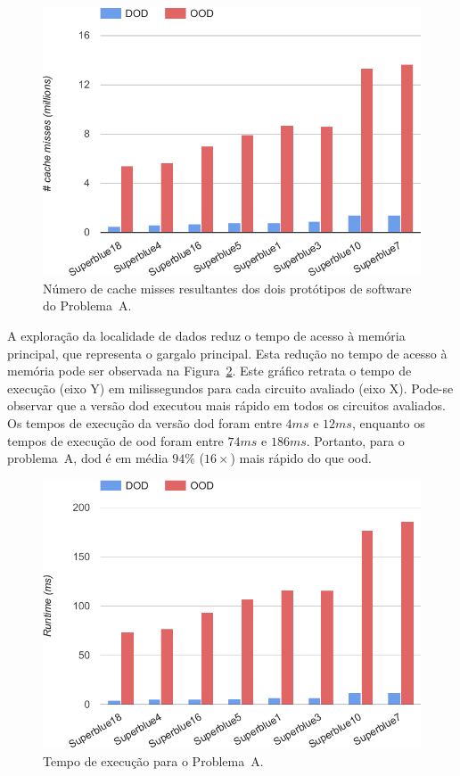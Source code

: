 \begin{figure}[ht]
    \centering
    \includegraphics[width=0.65\linewidth]{img/results/missProblemA}
    \caption[Cache misses do Problema~A.]{Número de cache misses resultantes dos dois protótipos de software do Problema~A.}
    \label{fig:missProblemA}
\end{figure}

A exploração da localidade de dados reduz o tempo de acesso à memória principal, que representa o gargalo principal. Esta redução no tempo de acesso à memória pode ser observada na Figura~\ref{fig:runtimeProblemA}. Este gráfico retrata o tempo de execução (eixo Y) em milissegundos para cada circuito avaliado (eixo X). Pode-se observar que a versão \ac{dod} executou mais rápido em todos os circuitos avaliados. Os tempos de execução da versão \ac{dod} foram entre $4ms$ e $12ms$, enquanto os tempos de execução de \ac{ood} foram entre $74ms$ e $186ms$. Portanto, para o problema~A, \ac{dod} é em média $94\%$ ($16\times$) mais rápido do que \ac{ood}.

\begin{figure}[ht]
    \centering
    \includegraphics[width=0.65\linewidth]{img/results/runtimeProblemA}
    \caption[Tempo de execução Problema~A]{Tempo de execução para o Problema~A.}
    \label{fig:runtimeProblemA}
\end{figure}

